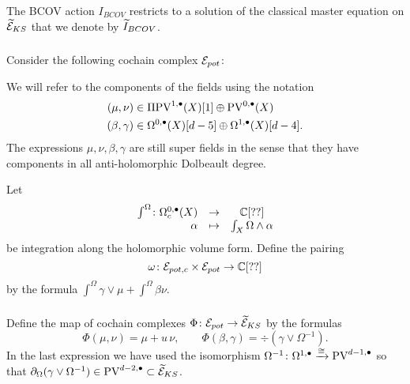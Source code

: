 \documentclass[11pt]{amsart}
\begin{document}
\begin{prop}
\label{prop:tilbcov}
The BCOV action $I_{BCOV}$ restricts to a solution of the classical master equation on $\widetilde{\mathcal E}_{KS}$ that we denote by $\widetilde{I}_{BCOV}$. 
\end{prop}

\subsubsection{}

Consider the following cochain complex $\mathcal E_{pot}$:
\beqn\label{eqn:E}
\eeqn
We will refer to the components of the fields using the notation
\begin{align*}
(\mu, \nu) & \in \Pi {\rm PV}^{1,\bullet}(X)[1] \oplus {\rm PV}^{0,\bullet}(X) \\
(\beta, \gamma) & \in \Omega^{0,\bullet}(X)[d-5] \oplus \Omega^{1,\bullet}(X) [d-4].
\end{align*}
The expressions $\mu,\nu,\beta,\gamma$ are still super fields in the sense that they have components in all anti-holomorphic Dolbeault degree. 

Let 
\[
\begin{array}{rccc}
\int^\Omega \colon \Omega_c^{0,\bullet}(X) & \to & \mathbb C [??] \\
\alpha & \mapsto & \int_{X} \Omega \wedge \alpha 
\end{array}
\]
be integration along the holomorphic volume form. 
Define the pairing 
\[
\omega \colon \mathcal E_{pot,c} \times \mathcal E_{pot} \to \mathbb C [??] 
\]
by the formula $\int^\Omega \gamma \vee \mu + \int^\Omega \beta \nu.$


\subsubsection{}

Define the map of cochain complexes $\Phi \colon \mathcal E_{pot} \to \widetilde{\mathcal E}_{KS}$
by the formulas
\[
\Phi (\mu,\nu) = \mu + u \, \nu,\qquad \Phi(\beta, \gamma) = \div \left( \gamma \vee \Omega^{-1} \right)  .
\]
In the last expression we have used the isomorphism $\Omega^{-1} \colon \Omega^{1,\bullet} \xrightarrow{\cong} {\rm PV}^{d-1,\bullet}$
so that $\partial_{\Omega}(\gamma \vee \Omega^{-1}) \in {\rm PV}^{d-2,\bullet} \subset \widetilde{\mathcal E}_{KS}$.
\end{document}
